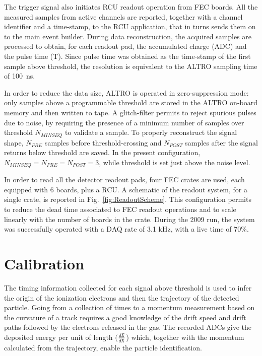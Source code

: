\documentclass[preprint,5p]{elsarticle}
\begin{document}
The trigger signal also initiates RCU readout operation from FEC boards. All 
the measured samples from active channels are reported, together with a channel 
identifier and a time-stamp, to the RCU application, that in turns sends them 
on to the main event builder. During data reconstruction, the acquired samples are 
processed to obtain, for each readout pad, the accumulated charge (ADC) and the 
pulse time (T). Since pulse time was obtained as the time-stamp of the first 
sample above threshold, the resolution is equivalent to the ALTRO sampling 
time of 100~ns.

In order to reduce the data size, ALTRO is operated in zero-suppression mode: 
only samples above a programmable threshold are stored in the ALTRO on-board 
memory and then written to tape. A glitch-filter permits to reject spurious 
pulses due to noise, by requiring the presence of a minimum number of samples 
over threshold $N_{MINSEQ}$ to validate a sample. To properly reconstruct 
the signal shape, $N_{PRE}$ samples before threshold-crossing and $N_{POST}$ 
samples after the signal returns below threshold are saved. In the present 
configuration, $N_{MINSEQ}=N_{PRE}=N_{POST}=3$, while threshold is set just 
above the noise level. 

In order to read all the detector readout pads, four FEC crates are used, 
each equipped with 6 boards, plus a RCU. A schematic of the readout system, 
for a single crate, is reported in Fig.~\ref{fig:ReadoutScheme}. This 
configuration permits to reduce the dead time associated to FEC readout 
operations and to scale linearly with the number of boards in the crate. During the 
2009 run, the system was successfully operated with a DAQ rate of 3.1 kHz, with 
a live time of $70 \%$.

\section{Calibration} \label{sec_calib}

The timing information collected for each signal above threshold
is used to infer the origin of the ionization electrons and 
then the trajectory of the detected particle. Going from a collection of 
times to a momentum measurement based on the curvature of a track 
requires a good knowledge of the drift speed 
and drift paths followed by the electrons released in the gas. The recorded ADCs give 
the deposited energy per unit of length ($\small{\frac{dE}{dX}}$) which, 
together with the momentum calculated from the trajectory, enable the particle 
identification.
\end{document}
